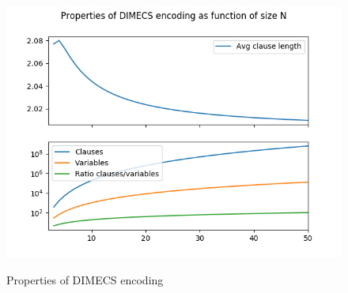 \documentclass{article}
\begin{document}
\begin{figure}
  \centering
  \includegraphics[width=.9\textwidth]{dimecs_props}
  \label{fig_dimecs_props}
  \caption{Properties of DIMECS encoding}
\end{figure}

\printbibliography
\end{document}
